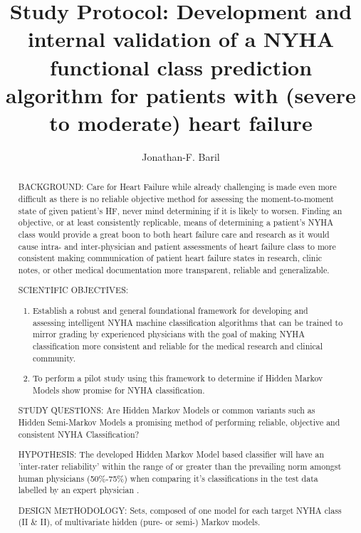 \documentclass[]{article}
\title{Study Protocol:
	\linebreak
	Development and internal validation of a NYHA functional class prediction algorithm for patients with (severe to moderate) heart failure}  %
\author{Jonathan-F. Baril}
\begin{document}
\maketitle

\clearpage

\begin{abstract} %
\noindent BACKGROUND: Care for Heart Failure while already challenging is made even more difficult as there is no reliable objective method for assessing the moment-to-moment state of given patient’s HF, never mind determining if it is likely to worsen. Finding an objective, or at least consistently replicable, means of determining a patient's NYHA class would provide a great boon to both heart failure care and research as it would cause intra- and inter-physician and patient assessments of heart failure class to more consistent making communication of patient heart failure states in research, clinic notes, or other medical documentation more transparent, reliable and generalizable.

\noindent SCIENTIFIC OBJECTIVES: 
\begin{enumerate}
	\item Establish a robust and general foundational framework for developing and assessing intelligent NYHA machine classification algorithms that can be trained to mirror grading by experienced physicians with the goal of making NYHA classification more consistent and reliable for the medical research and clinical community.
	\item To perform a pilot study using this framework to determine if Hidden Markov Models show promise for NYHA classification.
\end{enumerate}

\noindent STUDY QUESTIONS: Are Hidden Markov Models or common variants such as Hidden Semi-Markov Models a promising method of performing reliable, objective and consistent NYHA Classification?

\noindent HYPOTHESIS: The developed Hidden Markov Model based classifier will have an 'inter-rater reliability' within the range of or greater than the prevailing norm amongst human physicians (50\%-75\%) when comparing it's classifications in the test data labelled by an expert physician \cite{Carroll2014,Goldman1981a,Christensen2006,Raphael2007a,Kubo2004}.

\noindent DESIGN METHODOLOGY: Sets, composed of one model for each target NYHA class (II \& II), of multivariate hidden (pure- or semi-) Markov models. 


\end{abstract}
\end{document}
